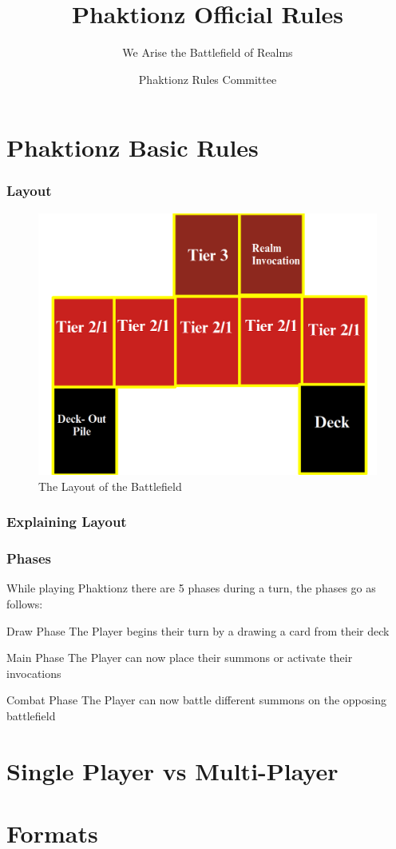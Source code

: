 \documentclass{beamer}
\title[Phaktionz Official Rules] %
{Phaktionz Official Rules}
\subtitle{We Arise the Battlefield of Realms}
\author[Phaktionz Rules Committee] %
{Phaktionz Rules Committee}
\institute[] %
{\inst{Casual Card Cafe}}
\date[] %
\begin{document}
\frame{\titlepage}


\section{Phaktionz Basic Rules}
\begin{frame}
    \frametitle{Layout}
    \begin{figure}
        \includegraphics[scale=0.22]{images/field.png}
        \caption{\textrm{The Layout of the Battlefield}}
    \end{figure}
\end{frame}

\begin{frame}
    \frametitle{Explaining Layout}

    

\end{frame}



\begin{frame}
    \frametitle{Phases}
    \textrm{While playing Phaktionz there are 5 phases during a turn, the phases go as follows:} 
    \begin{alertblock}{Draw Phase}
        \textrm{The Player begins their turn by a drawing a card from their deck}
    \end{alertblock}
    \begin{alertblock}{Main Phase}
       \textrm{The Player can now place their summons or activate their invocations}
    \end{alertblock}
    \begin{alertblock}{Combat Phase}
        \textrm{The Player can now battle different summons on the opposing battlefield}
    \end{alertblock}

\end{frame}




\section{Single Player vs Multi-Player}





\section{Formats}
\end{document}
